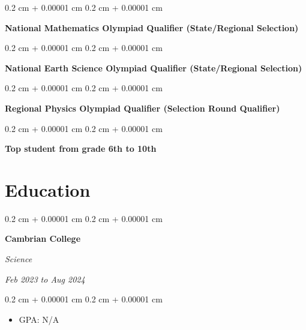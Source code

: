 \documentclass[10pt, letterpaper]{article}
\newenvironment{highlights}{
    \begin{itemize}[
        topsep=0.10 cm,
        parsep=0.10 cm,
        partopsep=0pt,
        itemsep=0pt,
        leftmargin=0.4 cm + 10pt
    ]
}{
    \end{itemize}
} %
\newenvironment{onecolentry}{
    \begin{adjustwidth}{
        0.2 cm + 0.00001 cm
    }{
        0.2 cm + 0.00001 cm
    }
}{
    \end{adjustwidth}
} %
\newenvironment{twocolentry}[2][]{
    \onecolentry
    \def\secondColumn{#2}
    \setcolumnwidth{\fill, 4.5 cm}
    \begin{paracol}{2}
}{
    \switchcolumn \raggedleft \secondColumn
    \end{paracol}
    \endonecolentry
} %
\begin{document}
        \vspace{0.2 cm}

        \begin{onecolentry}
            \textbf{National Mathematics Olympiad Qualifier (State/Regional Selection)}
        \end{onecolentry}



        \vspace{0.2 cm}

        \begin{onecolentry}
            \textbf{National Earth Science Olympiad Qualifier (State/Regional Selection)}
        \end{onecolentry}



        \vspace{0.2 cm}

        \begin{onecolentry}
            \textbf{Regional Physics Olympiad Qualifier (Selection Round Qualifier)}
        \end{onecolentry}



        \vspace{0.2 cm}

        \begin{onecolentry}
            \textbf{Top student from grade 6th to 10th}
        \end{onecolentry}




    
    \section{Education}



        
        \begin{twocolentry}{
            
            
        \textit{Feb 2023 to Aug 2024}}
            \textbf{Cambrian College}

            \textit{Science}
        \end{twocolentry}

        \vspace{0.10 cm}
        \begin{onecolentry}
            \begin{highlights}
                \item GPA: N/A
            \end{highlights}
        \end{onecolentry}



    
\end{document}
